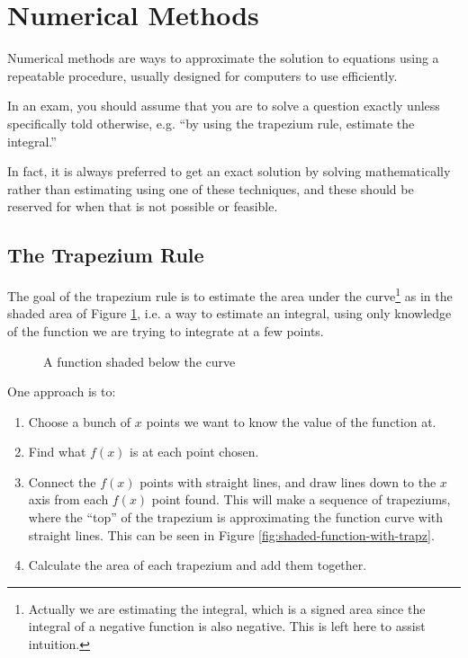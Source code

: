 \section{Numerical Methods}
Numerical methods are ways to approximate the solution to equations using a repeatable procedure, usually designed for computers to use efficiently.

In an exam, you should assume that you are to solve a question exactly unless specifically told otherwise, e.g. ``by using the trapezium rule, estimate the integral.''

In fact, it is always preferred to get an exact solution by solving mathematically rather than estimating using one of these techniques, and these should be reserved for when that is not possible or feasible.

\subsection{The Trapezium Rule}\label{sec:traprule}

The goal of the trapezium rule is to estimate the area under the curve\footnote{Actually we are estimating the integral, which is a signed area since the integral of a negative function is also negative. This is left here to assist intuition.} as in the shaded area of Figure \ref{fig:shaded-function}, i.e. a way to estimate an integral, using only knowledge of the function we are trying to integrate at a few points.

\begin{figure}[H]
\centering
{}
\caption{A function shaded below the curve}
\label{fig:shaded-function}
\end{figure}

One approach is to:

\begin{enumerate}
    \item Choose a bunch of $x$ points we want to know the value of the function at.
    \item Find what $f(x)$ is at each point chosen. 
    \item Connect the $f(x)$ points with straight lines, and draw lines down to the $x$ axis from each $f(x)$ point found. 
    This will make a sequence of trapeziums, where the ``top'' of the trapezium is approximating the function curve with straight lines.
    This can be seen in Figure \ref{fig:shaded-function-with-trapz}.
    \item Calculate the area of each trapezium and add them together.
\end{enumerate}

